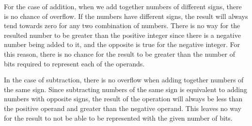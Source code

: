\documentclass[12pt]{article}
\begin{document}
    \par For the case of addition, when we add together numbers of different signs, there is no chance of overflow. If the numbers have different signs, the result will always tend towards zero for any two combination of numbers. There is no way for the resulted number to be greater than the positive integer since there is a negative number being added to it, and the opposite is true for the negative integer. For this reason, there is no chance for the result to be greater than the number of bits required to represent each of the operands.
    \par In the case of subtraction, there is no overflow when adding together numbers of the same sign. Since subtracting numbers of the same sign is equivalent to adding numbers with opposite signs, the result of the operation will always be less than the positive operand and greater than the negative operand. This leaves no way for the result to not be able to be represented with the given number of bits.
\end{document}
